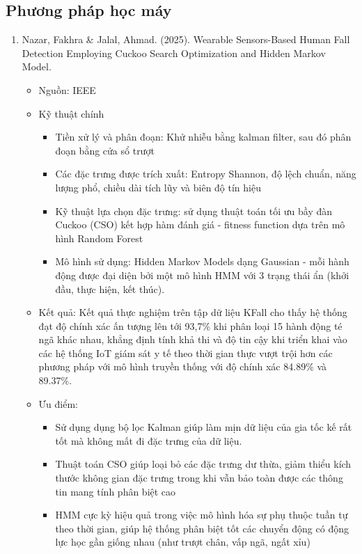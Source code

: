 \documentclass[../DoAn.tex]{subfiles}
\begin{document}
\subsection{Phương pháp học máy}
\begin{enumerate}[label=\arabic*)]
    \item Nazar, Fakhra & Jalal, Ahmad. (2025). Wearable Sensors-Based Human Fall Detection Employing Cuckoo Search Optimization and Hidden Markov Model. 
    \begin{itemize}
        \item Nguồn: IEEE 
        \item Kỹ thuật chính
        \begin{itemize}
            \item Tiền xử lý và phân đoạn: Khử nhiễu bằng kalman filter, sau đó phân đoạn bằng cửa sổ trượt
            \item Các đặc trưng được trích xuất: Entropy Shannon, độ lệch chuẩn, năng lượng phổ, chiều dài tích lũy và biên độ tín hiệu
            \item Kỹ thuật lựa chọn đặc trưng: sử dụng thuật toán tối ưu bầy đàn Cuckoo (CSO) kết hợp hàm đánh giá - fitness function dựa trên mô hình Random Forest
            \item Mô hình sử dụng: Hidden Markov Models dạng Gaussian - mỗi hành động được đại diện bởi một mô hình HMM với 3 trạng thái ẩn (khởi đầu, thực hiện, kết thúc). 
        \end{itemize}
        \item Kết quả: Kết quả thực nghiệm trên tập dữ liệu KFall cho thấy hệ thống đạt độ chính xác ấn tượng lên tới 93,7\% khi phân loại 15 hành động té ngã khác nhau, khẳng định tính khả thi và độ tin cậy khi triển khai vào các hệ thống IoT giám sát y tế theo thời gian thực vượt trội hơn các phương pháp với mô hình truyền thống với độ chính xác 84.89\% và 89.37\%.
        \item Ưu điểm:
        \begin{itemize}
            \item Sử dụng dụng bộ lọc Kalman giúp làm mịn dữ liệu của gia tốc kế rất tốt mà không mất đi đặc trưng của dữ liệu.
            \item Thuật toán CSO giúp loại bỏ các đặc trưng dư thừa, giảm thiểu kích thước không gian đặc trưng trong khi vẫn bảo toàn được các thông tin mang tính phân biệt cao
            \item HMM cực kỳ hiệu quả trong việc mô hình hóa sự phụ thuộc tuần tự theo thời gian, giúp hệ thống phân biệt tốt các chuyển động có động lực học gần giống nhau (như trượt chân, vấp ngã, ngất xỉu)

\end{itemize}
\end{itemize}
\end{enumerate}
\end{document}
